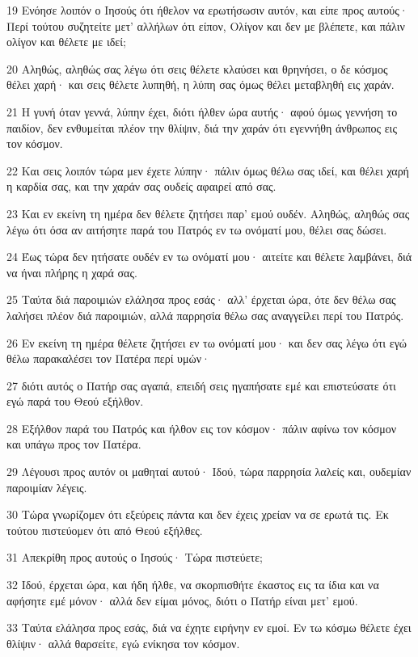 \par 19 Ενόησε λοιπόν ο Ιησούς ότι ήθελον να ερωτήσωσιν αυτόν, και είπε προς αυτούς· Περί τούτου συζητείτε μετ' αλλήλων ότι είπον, Ολίγον και δεν με βλέπετε, και πάλιν ολίγον και θέλετε με ιδεί;
\par 20 Αληθώς, αληθώς σας λέγω ότι σεις θέλετε κλαύσει και θρηνήσει, ο δε κόσμος θέλει χαρή· και σεις θέλετε λυπηθή, η λύπη σας όμως θέλει μεταβληθή εις χαράν.
\par 21 Η γυνή όταν γεννά, λύπην έχει, διότι ήλθεν ώρα αυτής· αφού όμως γεννήση το παιδίον, δεν ενθυμείται πλέον την θλίψιν, διά την χαράν ότι εγεννήθη άνθρωπος εις τον κόσμον.
\par 22 Και σεις λοιπόν τώρα μεν έχετε λύπην· πάλιν όμως θέλω σας ιδεί, και θέλει χαρή η καρδία σας, και την χαράν σας ουδείς αφαιρεί από σας.
\par 23 Και εν εκείνη τη ημέρα δεν θέλετε ζητήσει παρ' εμού ουδέν. Αληθώς, αληθώς σας λέγω ότι όσα αν αιτήσητε παρά του Πατρός εν τω ονόματί μου, θέλει σας δώσει.
\par 24 Έως τώρα δεν ητήσατε ουδέν εν τω ονόματί μου· αιτείτε και θέλετε λαμβάνει, διά να ήναι πλήρης η χαρά σας.
\par 25 Ταύτα διά παροιμιών ελάλησα προς εσάς· αλλ' έρχεται ώρα, ότε δεν θέλω σας λαλήσει πλέον διά παροιμιών, αλλά παρρησία θέλω σας αναγγείλει περί του Πατρός.
\par 26 Εν εκείνη τη ημέρα θέλετε ζητήσει εν τω ονόματί μου· και δεν σας λέγω ότι εγώ θέλω παρακαλέσει τον Πατέρα περί υμών·
\par 27 διότι αυτός ο Πατήρ σας αγαπά, επειδή σεις ηγαπήσατε εμέ και επιστεύσατε ότι εγώ παρά του Θεού εξήλθον.
\par 28 Εξήλθον παρά του Πατρός και ήλθον εις τον κόσμον· πάλιν αφίνω τον κόσμον και υπάγω προς τον Πατέρα.
\par 29 Λέγουσι προς αυτόν οι μαθηταί αυτού· Ιδού, τώρα παρρησία λαλείς και, ουδεμίαν παροιμίαν λέγεις.
\par 30 Τώρα γνωρίζομεν ότι εξεύρεις πάντα και δεν έχεις χρείαν να σε ερωτά τις. Εκ τούτου πιστεύομεν ότι από Θεού εξήλθες.
\par 31 Απεκρίθη προς αυτούς ο Ιησούς· Τώρα πιστεύετε;
\par 32 Ιδού, έρχεται ώρα, και ήδη ήλθε, να σκορπισθήτε έκαστος εις τα ίδια και να αφήσητε εμέ μόνον· αλλά δεν είμαι μόνος, διότι ο Πατήρ είναι μετ' εμού.
\par 33 Ταύτα ελάλησα προς εσάς, διά να έχητε ειρήνην εν εμοί. Εν τω κόσμω θέλετε έχει θλίψιν· αλλά θαρσείτε, εγώ ενίκησα τον κόσμον.

